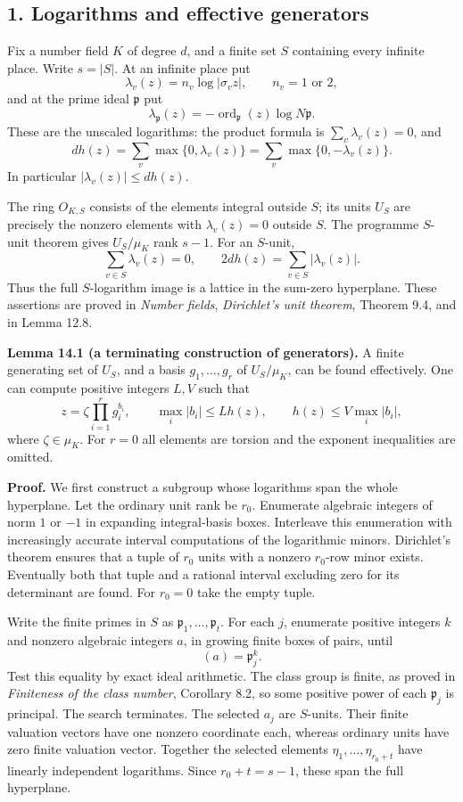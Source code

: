 \documentclass[
  11pt,
  a4paper,
]{article}
\begin{document}
\subsection{1. Logarithms and effective
generators}\label{logarithms-and-effective-generators}

Fix a number field \(K\) of degree \(d\), and a finite set \(S\)
containing every infinite place. Write \(s=|S|\). At an infinite place
put \[
\lambda_v(z)=n_v\log|\sigma_vz|,\qquad n_v=1\text{ or }2,
\] and at the prime ideal \(\mathfrak p\) put \[
\lambda_{\mathfrak p}(z)
 =-\operatorname{ord}_{\mathfrak p}(z)\log N\mathfrak p.
\tag{14.1}
\] These are the unscaled logarithms: the product formula is
\(\sum_v\lambda_v(z)=0\), and \[
dh(z)=\sum_v\max\{0,\lambda_v(z)\}
     =\sum_v\max\{0,-\lambda_v(z)\}.
\tag{14.2}
\] In particular \(|\lambda_v(z)|\le dh(z)\).

The ring \(O_{K,S}\) consists of the elements integral outside \(S\);
its units \(U_S\) are precisely the nonzero elements with
\(\lambda_v(z)=0\) outside \(S\). The programme \(S\)-unit theorem gives
\(U_S/\mu_K\) rank \(s-1\). For an \(S\)-unit, \[
\sum_{v\in S}\lambda_v(z)=0,\qquad
2dh(z)=\sum_{v\in S}|\lambda_v(z)|.
\tag{14.3}
\] Thus the full \(S\)-logarithm image is a lattice in the sum-zero
hyperplane. These assertions are proved in \emph{Number fields},
\emph{Dirichlet's unit theorem}, Theorem 9.4, and in Lemma 12.8.

\textbf{Lemma 14.1 (a terminating construction of generators).} A finite
generating set of \(U_S\), and a basis \(g_1,\ldots,g_r\) of
\(U_S/\mu_K\), can be found effectively. One can compute positive
integers \(L,V\) such that \[
z=\zeta\prod_{i=1}^r g_i^{b_i},\qquad
\max_i|b_i|\le Lh(z),\qquad
h(z)\le V\max_i|b_i|,
\tag{14.4}
\] where \(\zeta\in\mu_K\). For \(r=0\) all elements are torsion and the
exponent inequalities are omitted.

\textbf{Proof.} We first construct a subgroup whose logarithms span the
whole hyperplane. Let the ordinary unit rank be \(r_0\). Enumerate
algebraic integers of norm \(1\) or \(-1\) in expanding integral-basis
boxes. Interleave this enumeration with increasingly accurate interval
computations of the logarithmic minors. Dirichlet's theorem ensures that
a tuple of \(r_0\) units with a nonzero \(r_0\)-row minor exists.
Eventually both that tuple and a rational interval excluding zero for
its determinant are found. For \(r_0=0\) take the empty tuple.

Write the finite primes in \(S\) as
\(\mathfrak p_1,\ldots,\mathfrak p_t\). For each \(j\), enumerate
positive integers \(k\) and nonzero algebraic integers \(a\), in growing
finite boxes of pairs, until \[
(a)=\mathfrak p_j^k.
\tag{14.5}
\] Test this equality by exact ideal arithmetic. The class group is
finite, as proved in \emph{Finiteness of the class number}, Corollary
8.2, so some positive power of each \(\mathfrak p_j\) is principal. The
search terminates. The selected \(a_j\) are \(S\)-units. Their finite
valuation vectors have one nonzero coordinate each, whereas ordinary
units have zero finite valuation vector. Together the selected elements
\(\eta_1,\ldots,\eta_{r_0+t}\) have linearly independent logarithms.
Since \(r_0+t=s-1\), these span the full hyperplane.
\end{document}
